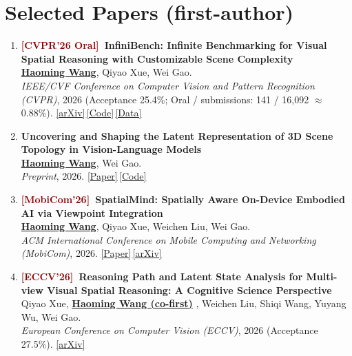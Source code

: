 \documentclass[11pt, letterpaper]{article}
\newenvironment{publist}{
  \begin{enumerate}[leftmargin=1.7em, itemsep=4pt, parsep=0pt, topsep=2pt,
                    label=\arabic*., ref=\arabic*, series=pubs]
}{\end{enumerate}}
\newcommand{\me}{\underline{\textbf{Haoming Wang}}}
\newcommand{\meco}{\underline{\textbf{Haoming Wang (co-first)}} }
\begin{document}
\section{Selected Papers (first-author)}

\begin{publist}
\item\label{pub:infinibench} \textbf{\textcolor{darkred}{[CVPR'26 Oral]}\ InfiniBench: Infinite Benchmarking for Visual Spatial Reasoning with Customizable Scene Complexity}\\
\me, Qiyao Xue, Wei Gao.\\
\textit{IEEE/CVF Conference on Computer Vision and Pattern Recognition (CVPR)}, 2026 (Acceptance 25.4\%; Oral / submissions: 141 / 16,092 $\approx$ 0.88\%). \href{https://arxiv.org/abs/2511.18200}{[arXiv]}\,\href{https://github.com/pittisl/infinibench}{[Code]}\,\href{https://huggingface.co/datasets/Haoming645/infinibench}{[Data]}


\item\label{pub:vlmlatent} \textbf{Uncovering and Shaping the Latent Representation of 3D Scene Topology in Vision-Language Models}\\
\me, Wei Gao.\\
\textit{Preprint}, 2026. \href{https://haomingwang645.github.io/pdfs/arxiv26_vlm_latent_shaping.pdf}{[Paper]}\,\href{https://github.com/pittisl/vlm-latent-shaping}{[Code]}

\item\label{pub:mosaic} \textbf{\textcolor{darkred}{[MobiCom'26]}\ SpatialMind: Spatially Aware On-Device Embodied AI via Viewpoint Integration}\\
\me, Qiyao Xue, Weichen Liu, Wei Gao.\\
\textit{ACM International Conference on Mobile Computing and Networking (MobiCom)}, 2026. \href{https://mobicom26.hotcrp.com/paper/1215}{[Paper]}\,\href{https://www.arxiv.org/abs/2602.07082}{[arXiv]}

\item\label{pub:remindview} \textbf{\textcolor{darkred}{[ECCV'26]}\ Reasoning Path and Latent State Analysis for Multi-view Visual Spatial Reasoning: A Cognitive Science Perspective}\\
Qiyao Xue, \meco, Weichen Liu, Shiqi Wang, Yuyang Wu, Wei Gao.\\
\textit{European Conference on Computer Vision (ECCV)}, 2026 (Acceptance 27.5\%). \href{https://arxiv.org/abs/2512.02340}{[arXiv]}


\end{publist}
\end{document}
